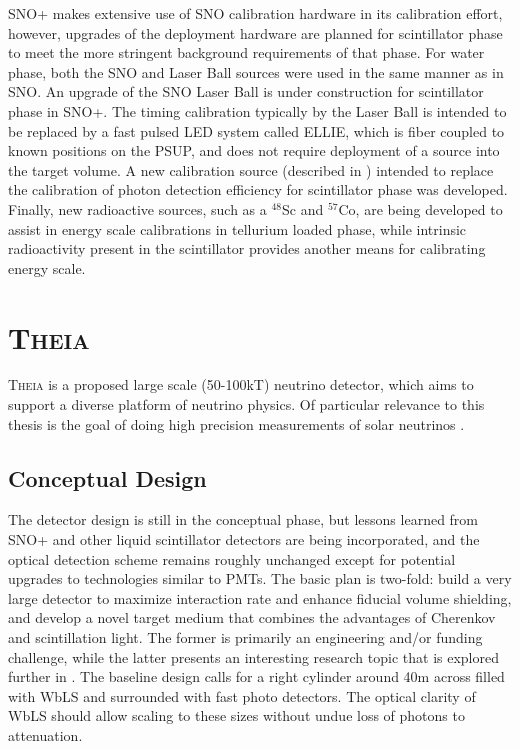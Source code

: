 SNO+ makes extensive use of SNO calibration hardware in its calibration effort, however, upgrades of the deployment hardware are planned for scintillator phase to meet the more stringent background requirements of that phase.
For water phase, both the SNO \N and Laser Ball sources were used in the same manner as in SNO.
An upgrade of the SNO Laser Ball is under construction for scintillator phase in SNO+.
The timing calibration typically by the Laser Ball is intended to be replaced by a fast pulsed LED system called ELLIE, which is fiber coupled to known positions on the PSUP, and does not require deployment of a source into the target volume.
A new calibration source (described in ) intended to replace the \N calibration of photon detection efficiency for scintillator phase was developed.
Finally, new radioactive sources, such as a $^{48}$Sc and $^{57}$Co, are being developed to assist in energy scale calibrations in tellurium loaded phase, while intrinsic radioactivity present in the scintillator provides another means for calibrating energy scale.

\section{\textsc{Theia}}

\textsc{Theia} \cite{asdc_paper} is a proposed large scale (50-100kT) neutrino detector, which aims to support a diverse platform of neutrino physics. 
Of particular relevance to this thesis is the goal of doing high precision measurements of solar neutrinos \cite{theia_solar}.

\subsection{Conceptual Design}
The detector design is still in the conceptual phase, but lessons learned from SNO+ and other liquid scintillator detectors are being incorporated, and the optical detection scheme remains roughly unchanged except for potential upgrades to technologies similar to PMTs.
The basic plan is two-fold: build a very large detector to maximize interaction rate and enhance fiducial volume shielding, and develop a novel target medium that combines the advantages of Cherenkov and scintillation light.
The former is primarily an engineering and/or funding challenge, while the latter presents an interesting research topic that is explored further in .
The baseline design calls for a right cylinder around 40m across filled with WbLS and surrounded with fast photo detectors.
The optical clarity of WbLS should allow scaling to these sizes without undue loss of photons to attenuation.

